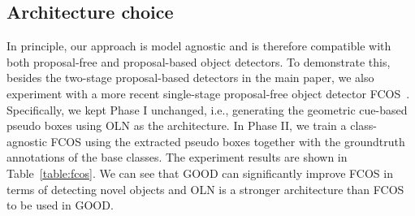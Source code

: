 \documentclass{article} \usepackage{iclr2023_conference,times}
\begin{document}
\begin{table}
\centering
{}
    \caption{\textbf{More comparison of GOOD-Both and GOOD-All.} For GOOD-All, the performance gains in detecting small objects (AR) are too small to compensate for the losses in detecting larger objects (AR and (AR)), leading to overall inferior performance.}\label{table:goodall}
\end{table}

\subsection{Architecture choice}
In principle, our approach is model agnostic and is therefore compatible with both proposal-free and proposal-based object detectors. To demonstrate this, besides the two-stage proposal-based detectors in the main paper, we also experiment with a more recent single-stage proposal-free object detector FCOS~\citep{tian2019fcos}. 
Specifically, we kept Phase I unchanged, i.e., generating the geometric cue-based pseudo boxes using OLN as the architecture. In Phase II, we train a class-agnostic FCOS using the extracted pseudo boxes together with the groundtruth annotations of the base classes.
The experiment results are shown in Table~\ref{table:fcos}. We can see that GOOD can  significantly improve FCOS in terms of detecting novel objects and OLN is a stronger architecture than FCOS to be used in GOOD.
\end{document}
